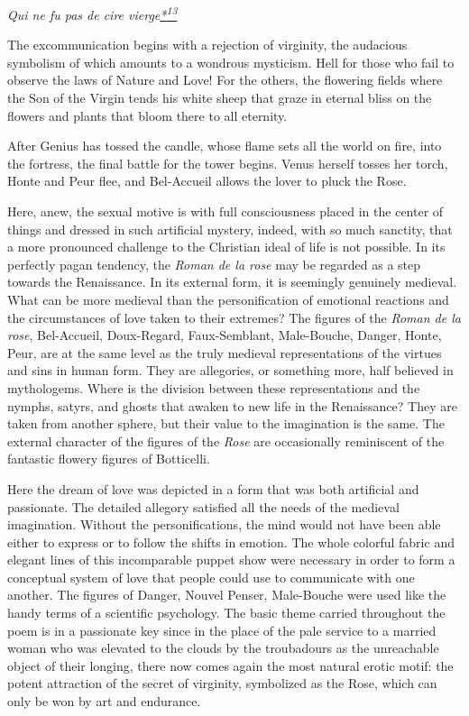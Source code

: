 \emph{Qui ne fu pas de cire
vierge\protect\hypertarget{11_Chapter_Four__THE_FORMS_OF_LOVE.xhtmlux5cux23id_3125}{\protect\hyperlink{23_NOTES.xhtmlux5cux23id_3126}{*\textsuperscript{13}}}}

The excommunication begins with a rejection of virginity, the audacious
symbolism of which amounts to a wondrous mysticism. Hell for those who
fail to observe the laws of Nature and Love! For the others, the
flowering fields where the Son of the Virgin tends his white sheep that
graze in eternal bliss on the flowers and plants that bloom there to all
eternity.

After Genius has tossed the candle, whose flame sets all the world on
fire, into the fortress, the final battle for the tower begins. Venus
herself tosses her torch, Honte and Peur flee, and Bel-Accueil allows
the lover to pluck the Rose.

Here, anew, the sexual motive is with full consciousness placed in the
center of things and dressed in such artificial mystery, indeed, with so
much sanctity, that a more pronounced challenge to the Christian ideal
of life is not possible. In its perfectly pagan tendency, the
\emph{Roman de la rose} may be regarded as a step towards the
Renaissance. In its external form, it is seemingly genuinely
medi\protect\hypertarget{11_Chapter_Four__THE_FORMS_OF_LOVE.xhtmlux5cux23page_136}{}{}eval.
What can be more medieval than the personification of emotional
reactions and the circumstances of love taken to their extremes? The
figures of the \emph{Roman de la rose}, Bel-Accueil, Doux-Regard,
Faux-Semblant, Male-Bouche, Danger, Honte, Peur, are at the same level
as the truly medieval representations of the virtues and sins in human
form. They are allegories, or something more, half believed in
mythologems. Where is the division between these representations and the
nymphs, satyrs, and ghosts that awaken to new life in the Renaissance?
They are taken from another sphere, but their value to the imagination
is the same. The external character of the figures of the \emph{Rose}
are occasionally reminiscent of the fantastic flowery figures of
Botticelli.

Here the dream of love was depicted in a form that was both artificial
and passionate. The detailed allegory satisfied all the needs of the
medieval imagination. Without the personifications, the mind would not
have been able either to express or to follow the shifts in emotion. The
whole colorful fabric and elegant lines of this incomparable puppet show
were necessary in order to form a conceptual system of love that people
could use to communicate with one another. The figures of Danger, Nouvel
Penser, Male-Bouche were used like the handy terms of a scientific
psychology. The basic theme carried throughout the poem is in a
passionate key since in the place of the pale service to a married woman
who was elevated to the clouds by the troubadours as the unreachable
object of their longing, there now comes again the most natural erotic
motif: the potent attraction of the secret of virginity, symbolized as
the Rose, which can only be won by art and endurance.

